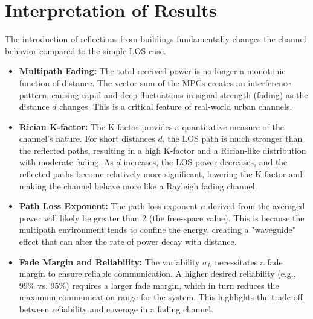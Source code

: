 \section{Interpretation of Results}
The introduction of reflections from buildings fundamentally changes the channel behavior compared to the simple LOS case.
\begin{itemize}
	\item \textbf{Multipath Fading:} The total received power is no longer a monotonic function of distance. The vector sum of the MPCs creates an interference pattern, causing rapid and deep fluctuations in signal strength (fading) as the distance $d$ changes. This is a critical feature of real-world urban channels.
	\item \textbf{Rician K-factor:} The K-factor provides a quantitative measure of the channel's nature. For short distances $d$, the LOS path is much stronger than the reflected paths, resulting in a high K-factor and a Rician-like distribution with moderate fading. As $d$ increases, the LOS power decreases, and the reflected paths become relatively more significant, lowering the K-factor and making the channel behave more like a Rayleigh fading channel.
	\item \textbf{Path Loss Exponent:} The path loss exponent $n$ derived from the averaged power will likely be greater than 2 (the free-space value). This is because the multipath environment tends to confine the energy, creating a "waveguide" effect that can alter the rate of power decay with distance.
	\item \textbf{Fade Margin and Reliability:} The variability $\sigma_L$ necessitates a fade margin to ensure reliable communication. A higher desired reliability (e.g., 99\% vs. 95\%) requires a larger fade margin, which in turn reduces the maximum communication range for the system. This highlights the trade-off between reliability and coverage in a fading channel.
\end{itemize}
